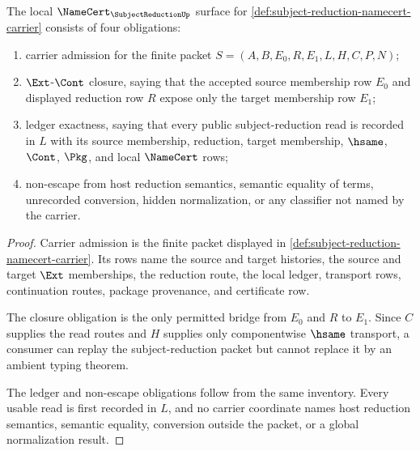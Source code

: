 \begin{theorem}
\label{thm:subject-reduction-namecert-obligations}
The local $\NameCert_{\SubjectReductionUp}$ surface for \autoref{def:subject-reduction-namecert-carrier} consists of four obligations:
\begin{enumerate}
\item carrier admission for the finite packet $S=(A,B,E_0,R,E_1,L,H,C,P,N)$;
\item $\Ext$-$\Cont$ closure, saying that the accepted source membership row $E_0$ and displayed reduction row $R$ expose only the target membership row $E_1$;
\item ledger exactness, saying that every public subject-reduction read is recorded in $L$ with its source membership, reduction, target membership, $\hsame$, $\Cont$, $\Pkg$, and local $\NameCert$ rows;
\item non-escape from host reduction semantics, semantic equality of terms, unrecorded conversion, hidden normalization, or any classifier not named by the carrier.
\end{enumerate}
\end{theorem}
\begin{proof}
Carrier admission is the finite packet displayed in \autoref{def:subject-reduction-namecert-carrier}. Its rows name the source and target histories, the source and target $\Ext$ memberships, the reduction route, the local ledger, transport rows, continuation routes, package provenance, and certificate row.

The closure obligation is the only permitted bridge from $E_0$ and $R$ to $E_1$. Since $C$ supplies the read routes and $H$ supplies only componentwise $\hsame$ transport, a consumer can replay the subject-reduction packet but cannot replace it by an ambient typing theorem.

The ledger and non-escape obligations follow from the same inventory. Every usable read is first recorded in $L$, and no carrier coordinate names host reduction semantics, semantic equality, conversion outside the packet, or a global normalization result.
\end{proof}

